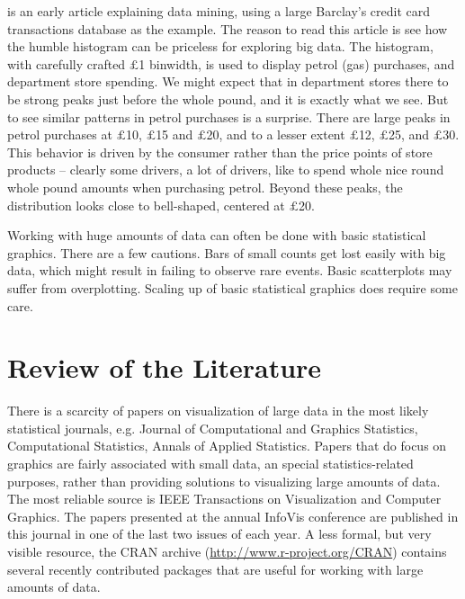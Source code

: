\documentclass{article}
\begin{document}
\citet{hand2000} is an early article explaining data mining, using a large Barclay's credit card transactions database as the example. The reason to read this article is see how the humble histogram can be priceless for exploring big data. The histogram, with carefully crafted $\pounds$1 binwidth, is used to display petrol (gas) purchases, and department store spending. We might expect that in department stores there to be strong peaks just before the whole pound, and it is exactly what we see. But to see similar patterns in petrol purchases is a surprise. There are large peaks in petrol purchases at $\pounds$10, $\pounds$15 and $\pounds$20, and to a lesser extent $\pounds$12, $\pounds$25, and $\pounds$30. This behavior is driven by the consumer rather than the price points of store products -- clearly some drivers, a lot of drivers, like to spend whole nice round whole pound amounts when purchasing petrol. Beyond these peaks, the distribution looks close to bell-shaped, centered at $\pounds$20.

Working with huge amounts of data can often be done with basic statistical graphics. There are a few cautions. Bars of small counts get lost easily with big data, which might result in failing to observe rare events. Basic scatterplots may suffer from overplotting.  Scaling up of basic statistical graphics does require some care.

\section{Review of the Literature}


There is a scarcity of papers on visualization of large data in the most likely statistical journals, e.g. Journal of Computational and Graphics Statistics, Computational Statistics, Annals of Applied Statistics. Papers that do focus on graphics are fairly associated with small data, an special statistics-related purposes, rather than providing solutions to visualizing large amounts of data. The most reliable source is IEEE Transactions on Visualization and Computer Graphics. The papers presented at the annual InfoVis conference are published in this journal in one of the last two issues of each year. A less formal, but very visible resource, the CRAN archive (\url{http://www.r-project.org/CRAN}) contains several recently contributed packages that are useful for working with large amounts of data.
\end{document}
